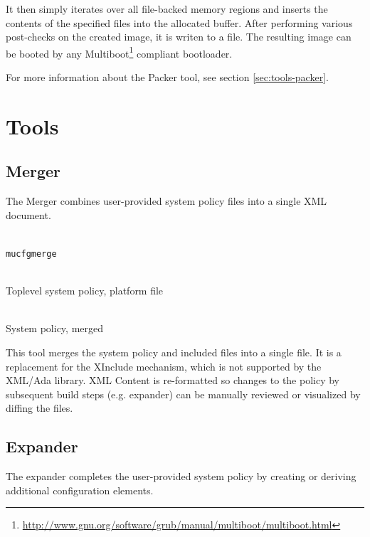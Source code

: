 \documentclass[a4paper,twoside,titlepage]{article}
\begin{document}
It then simply iterates over all file-backed memory regions and inserts the
contents of the specified files into the allocated buffer. After performing
various post-checks on the created image, it is writen to a file. The resulting
image can be booted by any
Multiboot\footnote{\url{http://www.gnu.org/software/grub/manual/multiboot/multiboot.html}}
compliant bootloader.

For more information about the Packer tool, see section \ref{sec:tools-packer}.

\section{Tools}
\label{sec:tools}

\subsection{Merger}
\label{sec:tools-merger}
The Merger combines user-provided system policy files into a single XML
document.

\begin{description} \itemsep1pt \parskip0pt
	\item[Name] \hfill \\
		\texttt{mucfgmerge}
	\item[Input] \hfill \\
		Toplevel system policy, platform file
	\item[Output] \hfill \\
		System policy, merged
\end{description}

This tool merges the system policy and included files into a single file. It is
a replacement for the XInclude mechanism, which is not supported by the XML/Ada
library. XML Content is re-formatted so changes to the policy by subsequent
build steps (e.g. expander) can be manually reviewed or visualized by diffing
the files.

\subsection{Expander}
\label{sec:tools-expander}
The expander completes the user-provided system policy by creating or deriving
additional configuration elements.
\end{document}
